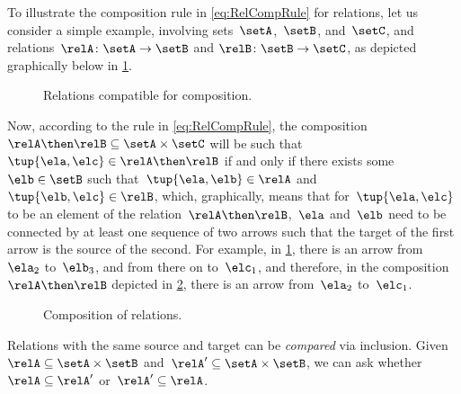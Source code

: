 To illustrate the composition rule in \cref{eq:RelCompRule} for relations, let us consider a simple example, involving sets~$\setA$,~$\setB$, and~$\setC$, and relations~$\relA \colon \setA \to \setB$ and $\relB \colon \setB \to \setC$, as depicted graphically below in \cref{fig:example_rel_composable}.
%
\begin{figure}[h!]
  \centering
  \caption{Relations compatible for composition.}
  \label{fig:example_rel_composable}
\end{figure}
%
Now, according to the rule in \cref{eq:RelCompRule}, the composition~$\relA \then \relB \subseteq \setA \times \setC$ will be such that~$\tup{\ela,\elc} \in \relA \then \relB$ if and only if there exists some~$\elb \in \setB$ such that~$\tup{\ela,\elb} \in \relA$ and~$\tup{\elb,\elc} \in \relB$, which, graphically, means that for~$\tup{\ela,\elc}$ to be an element of the relation~$\relA \then \relB$,~$\ela$ and~$\elb$ need to be connected by at least one sequence of two arrows such that the target of the first arrow is the source of the second.
For example, in \cref{fig:example_rel_composable}, there is an arrow from~$\ela_2$ to~$\elb_3$, and from there on to~$\elc_1$, and therefore, in the composition~$\relA \then \relB$ depicted in \cref{fig:example_rel_composed}, there is an arrow from~$\ela_2$ to~$\elc_1$.
%
\begin{figure}[h!]
  \centering
  \caption{Composition of relations.}
  \label{fig:example_rel_composed}
\end{figure}

\begin{remark}
  Relations with the same source and target can be \emph{compared} via inclusion.
  Given~$\relA \subseteq \setA\times \setB$ and~$\relA'\subseteq \setA\times \setB$, we can ask whether~$\relA\subseteq \relA'$ or~$\relA'\subseteq \relA$.
\end{remark}